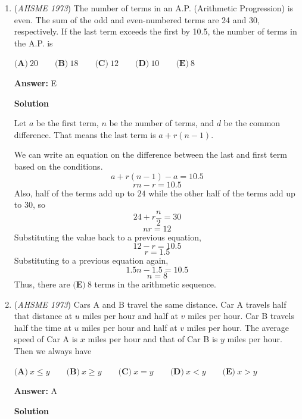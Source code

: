 \begin{enumerate}
 


	\item (\textit{AHSME 1973}) The number of terms in an A.P. (Arithmetic Progression) is even. The sum of the odd and even-numbered terms are 24 and 30, respectively. If the last term exceeds the first by 10.5, the number of terms in the A.P. is 


 $\textbf{(A)}\ 20 \qquad \textbf{(B)}\ 18 \qquad \textbf{(C)}\ 12 \qquad \textbf{(D)}\ 10 \qquad \textbf{(E)}\ 8$

 \textbf{Answer: }E



\textbf{Solution}

Let $a$ be the first term, $n$ be the number of terms, and $d$ be the common difference.  That means the last term is $a+r(n-1)$.

 We can write an equation on the difference between the last and first term based on the conditions.
 \[a+r(n-1)-a =10.5\]
 \[rn-r=10.5\]Also, half of the terms add up to $24$ while the other half of the terms add up to $30$, so
 \[24 + r\frac{n}{2} = 30\]
 \[nr = 12\]Substituting the value back to a previous equation,
 \[12-r=10.5\]
 \[r=1.5\]Substituting to a previous equation again,
 \[1.5n-1.5=10.5\]
 \[n=8\]Thus, there are $\boxed{\textbf{(E)}\ 8}$ terms in the arithmetic sequence.

 


	\item (\textit{AHSME 1973}) Cars A and B travel the same distance. Car A travels half that distance at $u$ miles per hour and half at $v$ miles per hour. Car B travels half the time at $u$ miles per hour and half at $v$ miles per hour. The average speed of Car A is $x$ miles per hour and that of Car B is $y$ miles per hour. Then we always have 


 $\textbf{(A)}\ x \leq y\qquad \textbf{(B)}\ x \geq y \qquad \textbf{(C)}\ x=y \qquad \textbf{(D)}\ x<y\qquad \textbf{(E)}\ x>y$

 \textbf{Answer: }A



\textbf{Solution}


\end{enumerate}
